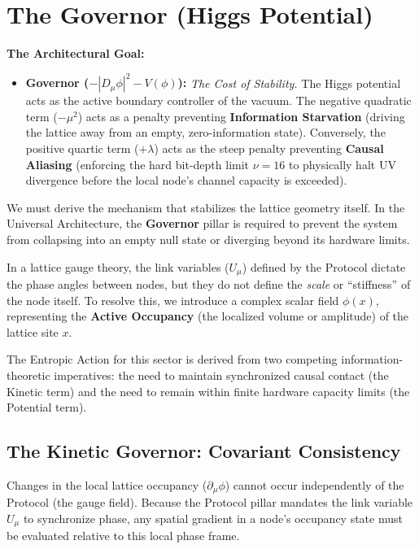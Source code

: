 \section{The Governor (Higgs Potential)}
\label{sec:governor}

\textbf{The Architectural Goal:}
\begin{itemize}
    \item \textbf{Governor ($-|D_\mu\phi|^2 - V(\phi)$):} \textit{The Cost of Stability.} The Higgs potential acts as the active boundary controller of the vacuum. The negative quadratic term ($-\mu^2$) acts as a penalty preventing \textbf{Information Starvation} (driving the lattice away from an empty, zero-information state). Conversely, the positive quartic term ($+\lambda$) acts as the steep penalty preventing \textbf{Causal Aliasing} (enforcing the hard bit-depth limit $\nu=16$ to physically halt UV divergence before the local node's channel capacity is exceeded).
\end{itemize}

We must derive the mechanism that stabilizes the lattice geometry itself. In the Universal Architecture, the \textbf{Governor} pillar is required to prevent the system from collapsing into an empty null state or diverging beyond its hardware limits.

In a lattice gauge theory, the link variables ($U_\mu$) defined by the Protocol dictate the phase angles between nodes, but they do not define the \textit{scale} or ``stiffness'' of the node itself. To resolve this, we introduce a complex scalar field $\phi(x)$, representing the \textbf{Active Occupancy} (the localized volume or amplitude) of the lattice site $x$.

The Entropic Action for this sector is derived from two competing information-theoretic imperatives: the need to maintain synchronized causal contact (the Kinetic term) and the need to remain within finite hardware capacity limits (the Potential term).

\subsection{The Kinetic Governor: Covariant Consistency}
Changes in the local lattice occupancy ($\partial_\mu \phi$) cannot occur independently of the Protocol (the gauge field). Because the Protocol pillar mandates the link variable $U_\mu$ to synchronize phase, any spatial gradient in a node's occupancy state must be evaluated relative to this local phase frame. 


